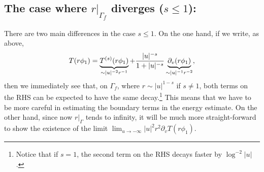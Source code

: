 \documentclass[11pt,english]{article}
\numberwithin{equation}{section}
\theoremstyle{remark}
\theoremstyle{plain}
\theoremstyle{remark}
\newcommand{\pv}{\partial_v}
\renewcommand{\(}{\left(}
\renewcommand{\)}{\right)}
\begin{document}
\subsection{The case where \texorpdfstring{$r|_{\Gamma_f}$}{r-Gamma-f} diverges (\texorpdfstring{$s\leq 1$}{s leq 1}):}
There are two main differences in the case $s\leq 1$. On the one hand, if we write, as above, 
\begin{equation}
T(r\phi_1)=\underbrace{\te(r\phi_1)}_{\sim |u|^{-2}r^{-1}}+\frac{|u|^{-s}}{1+|u|^{-s}}\underbrace{\pv(r\phi_1)}_{\sim |u|^{-1}r^{-2}},
\end{equation}
then we immediately see that, on $\Gamma_f$, where $r\sim|u|^{1-s}$ if $s\neq 1$, both terms on the RHS can be expected to have the same decay.\footnote{Notice that if $s=1$, the second term on the RHS decays faster by $\log^{-2}|u|$.} This means that we have to be more careful in estimating the boundary terms in the energy estimate. On the other hand, since now $r|_{\Gamma}$ tends to infinity, it will be much more straight-forward to show the existence of the limit $\lim_{u\to-\infty}|u|^2r^2\pv T(r\phi_1)$. 
\end{document}
